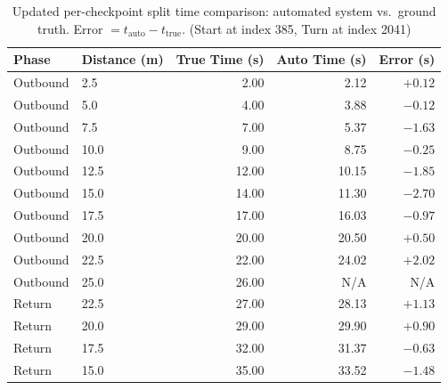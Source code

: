 \begin{table}[htbp] 
    \centering
    \caption{Updated per-checkpoint split time comparison: automated system vs.\ ground truth. Error $= t_{\text{auto}} - t_{\text{true}}$. (Start at index 385, Turn at index 2041)}\label{tab:split_errors_updated}
    \begin{tabular}{llrrr}
        \hline
        Phase                                     & Distance (m)     & True Time (s) & Auto Time (s) & Error (s) \\
        \hline
        Outbound                                  & 2.5              & 2.00          & 2.12          & $+0.12$   \\
        Outbound                                  & 5.0              & 4.00          & 3.88          & $-0.12$   \\
        Outbound                                  & 7.5              & 7.00          & 5.37          & $-1.63$   \\
        Outbound                                  & 10.0             & 9.00          & 8.75          & $-0.25$   \\
        Outbound                                  & 12.5             & 12.00         & 10.15         & $-1.85$   \\
        Outbound                                  & 15.0             & 14.00         & 11.30         & $-2.70$   \\
        Outbound                                  & 17.5             & 17.00         & 16.03         & $-0.97$   \\
        Outbound                                  & 20.0             & 20.00         & 20.50         & $+0.50$   \\
        Outbound                                  & 22.5             & 22.00         & 24.02         & $+2.02$   \\
        Outbound                                  & 25.0             & 26.00         & N/A           & N/A       \\
        \hline
        Return                                    & 22.5             & 27.00         & 28.13         & $+1.13$   \\
        Return                                    & 20.0             & 29.00         & 29.90         & $+0.90$   \\
        Return                                    & 17.5             & 32.00         & 31.37         & $-0.63$   \\
        Return                                    & 15.0             & 35.00         & 33.52         & $-1.48$   \\

\end{tabular}
\end{table}
